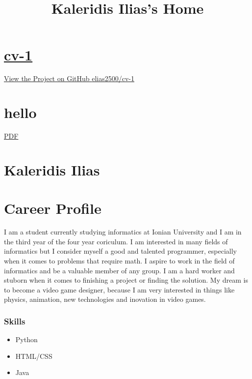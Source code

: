 \documentclass[american,]{article}
\title{Kaleridis Ilias's Home}
\date{}
\begin{document}
\maketitle

\hypertarget{cv-1}{%
\section{\texorpdfstring{\href{http://0.0.0.0:4000/}{cv-1}}{cv-1}}\label{cv-1}}

\href{https://github.com/elias2500/cv-1}{View the Project on GitHub
{elias2500/cv-1}}

\hypertarget{hello}{%
\section{hello}\label{hello}}

\href{pdf/index.pdf}{PDF}

\hypertarget{kaleridis-ilias}{%
\section{Kaleridis Ilias}\label{kaleridis-ilias}}

\hypertarget{career-profile}{%
\section{Career Profile}\label{career-profile}}

I am a student currently studying informatics at Ionian University and I
am in the third year of the four year coriculum. I am interested in many
fields of informatics but I consider myself a good and talented
programmer, especially when it comes to problems that require math. I
aspire to work in the field of informatics and be a valuable member of
any group. I am a hard worker and stuborn when it comes to finishing a
project or finding the solution. My dream is to become a video game
designer, because I am very interested in things like physics,
animation, new technologies and inovation in video games.

\hypertarget{skills}{%
\subsubsection{Skills}\label{skills}}

\begin{itemize}
\item
  Python
\item
  HTML/CSS
\item
  Java
\end{itemize}
\end{document}
